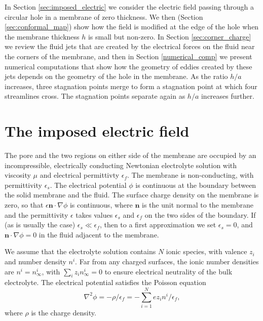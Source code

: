 In Section \ref{sec:imposed_electric} we consider the electric field passing through a circular hole in
a membrane of zero thickness. We then (Section \ref{sec:conformal_map})
show how the field is modified at
the edge of the hole when the membrane thickness $h$ is small but non-zero.
In Section \ref{sec:corner_charge}
we review the fluid jets that are created by the electrical
forces on 
the
fluid near the
corners of the membrane, and then in Section \ref{numerical_comp} we present 
numerical computations that show how the geometry of
eddies created by these jets depends on the geometry of the hole in
the membrane. As the ratio $h/a$ increases, three
stagnation points merge to form
a stagnation point at which four streamlines cross. The
stagnation points separate again
as $h/a$ increases further.

\section{The imposed electric field\label{sec:imposed_electric}}

The pore
and the two regions on either side of the membrane are occupied by
an incompressible, electrically conducting
Newtonian electrolyte solution
with viscosity $\mu$ and electrical permittivty
$\epsilon_f$. The membrane is non-conducting, with permittivity $\epsilon_s$.
The electrical potential $\phi$ is continuous at the boundary
between the solid membrane and the fluid.
The surface charge density
on the membrane is zero, so that
$\epsilon\mathbf n\cdot\nabla\phi$ is continuous,
where $\mathbf n$ is the unit normal to the membrane
and the permittivity $\epsilon$ takes values $\epsilon_s$ and
$\epsilon_f$ on the two sides of the boundary. If (as is usually
the case) $\epsilon_s\ll\epsilon_f$, then to a first approximation
we set $\epsilon_s=0$, and
$\mathbf n\cdot\nabla\phi=0$ in the fluid adjacent to the membrane.

We assume that the electrolyte solution
contains $N$ ionic species,
with valence $z_i$ and number density $n^i$.
Far from any charged surfaces, the ionic
number densities are $n^i=n^i_\infty$, with $\sum_i z_in_\infty^i=0$
to ensure electrical neutrality of the bulk electrolyte.
The electrical potential satisfies the Poisson equation
\begin{equation}
\nabla^2\phi=-\rho/\epsilon_f=-\sum_{i=1}^Nez_in^i/\epsilon_f,
\label{poisson}
\end{equation}
where $\rho$ is the charge density.

